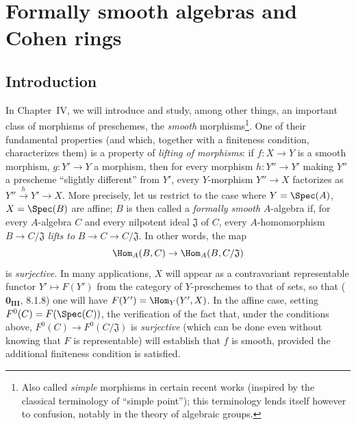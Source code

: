 \section{Formally smooth algebras and Cohen rings}
\label{section:0.19}

\subsection{Introduction}
\label{subsection:0.19.0}

\begin{env}[19.0.1]
\label{0.19.0.1}
In Chapter~IV, we will introduce and study, among other things, an important class of morphisms of preschemes, the \emph{smooth} morphisms\footnote{Also called \emph{simple} morphisms in certain recent works (inspired by the classical terminology of ``simple point''); this terminology lends itself however to confusion, notably in the theory of algebraic groups.}.
One of their fundamental properties (and which, together with a finiteness condition, characterizes them) is a property of \emph{lifting of morphisms}:
if $f:X\to Y$ is a smooth morphism, $g:Y'\to Y$ a morphism, then for every morphism $h:Y''\to Y'$ making $Y''$ a prescheme ``slightly different'' from $Y'$, every $Y$-morphism $Y''\to X$ factorizes as $Y''\xrightarrow{h}Y'\to X$.
More precisely, let us restrict to the case where $Y=\Spec(A)$, $X=\Spec(B)$ are affine;
$B$ is then called a \emph{formally smooth} $A$-algebra if, for every $A$-algebra $C$ and every nilpotent ideal $\mathfrak{J}$ of $C$, every $A$-homomorphism $B\to C/\mathfrak{J}$ \emph{lifts to} $B\to C\to C/\mathfrak{J}$.
In other words, the map
\[
  \Hom_A(B,C) \to \Hom_A(B,C/\mathfrak{J})
\]
is \emph{surjective}.
In many applications, $X$ will appear as a contravariant representable functor $Y'\mapsto F(Y')$ from the category of $Y$-preschemes to that of sets, so that ($\mathbf{0_{III}}$, 8.1.8) one will have $F(Y')=\Hom_Y(Y',X)$.
In the affine case, setting $F^0(C)=F(\Spec(C))$, the verification of the fact that, under the conditions above, $F^0(C)\to F^0(C/\mathfrak{J})$ is \emph{surjective} (which can be done even without knowing that $F$ is representable) will establish that $f$ is smooth, provided the additional finiteness condition is satisfied.
\end{env}

